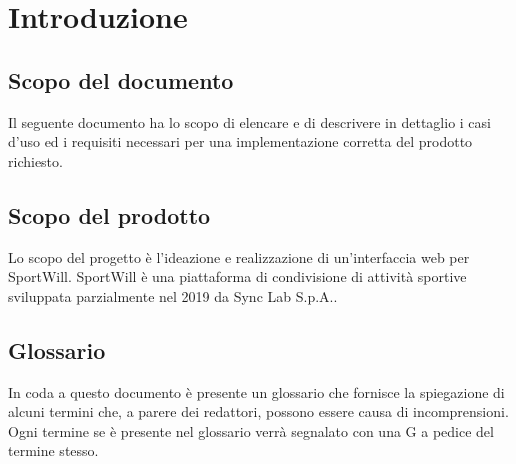 \section{Introduzione}

\subsection{Scopo del documento}

Il seguente documento ha lo scopo di elencare e di descrivere in dettaglio i casi d’uso ed i requisiti necessari per una implementazione corretta del prodotto richiesto.


\subsection{Scopo del prodotto}

Lo scopo del progetto è l'ideazione e realizzazione di un'interfaccia web per SportWill.
\newline SportWill è una piattaforma di condivisione di attività sportive sviluppata parzialmente nel 2019 da Sync Lab S.p.A..

\subsection{Glossario}

In coda a questo documento è presente un glossario che fornisce la spiegazione di alcuni termini che, a parere dei redattori, possono essere causa di incomprensioni. Ogni termine se è presente nel glossario verrà segnalato con una G a pedice del termine stesso.

